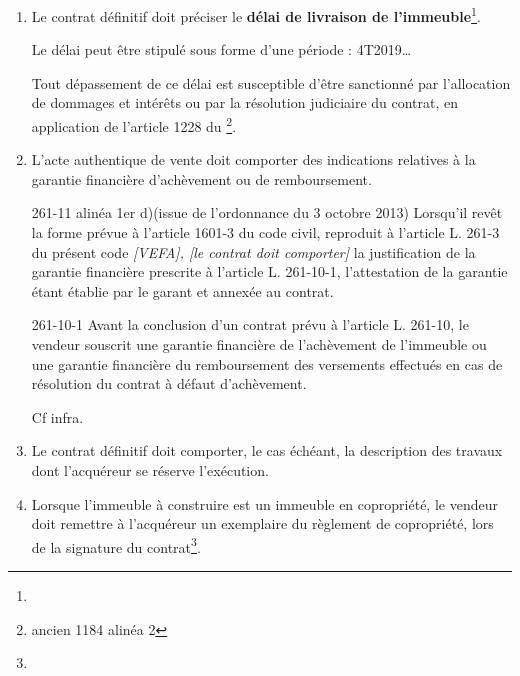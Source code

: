 \begin{enumerate}
					Le contrat définitif doit préciser les modalités d’échelonnement du prix ainsi que ces conditions de révision (voir infra).

					\item Le contrat définitif doit préciser le \textbf{délai de livraison de l'immeuble}\footnote{}.

					Le délai peut être stipulé sous forme d’une période : 4T2019…

					Tout dépassement de ce délai est susceptible d'être sanctionné par l’allocation de dommages et intérêts ou par la résolution judiciaire du contrat, en application de l'article 1228 du \cciv\footnote{ancien 1184 alinéa 2}.


					\item 	L'acte authentique de vente doit comporter des indications relatives à la garantie financière d’achèvement ou de remboursement.


					\begin{citationArticle}[L]{261-11 alinéa 1er d)}{\cch (issue de l’ordonnance du 3 octobre 2013)}
						Lorsqu'il revêt la forme prévue à l'article 1601-3 du code civil, reproduit à l'article L. 261-3 du présent code \emph{[VEFA], [le contrat doit comporter]} la justification de la garantie financière prescrite à l'article L. 261-10-1, l'attestation de la garantie étant établie par le garant et annexée au contrat.
					\end{citationArticle}

					\begin{citationArticle}[L]{261-10-1}{\cch}
						Avant la conclusion d'un contrat prévu à l'article L. 261-10, le vendeur souscrit une garantie financière de l'achèvement de l'immeuble ou une garantie financière du remboursement des versements effectués en cas de résolution du contrat à défaut d'achèvement.
					\end{citationArticle}

					Cf infra.


					\item  Le contrat définitif doit comporter, le cas échéant, la description des travaux dont l'acquéreur se réserve l'exécution.


					\item 	Lorsque l'immeuble à construire est un immeuble en copropriété, le vendeur doit remettre à l'acquéreur un exemplaire du règlement de copropriété, lors de la signature du contrat\footnote{}.


\end{enumerate}
